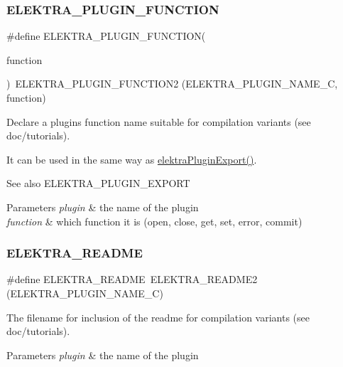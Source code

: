 \subsubsection{\texorpdfstring{ELEKTRA\_PLUGIN\_FUNCTION}{ELEKTRA\_PLUGIN\_FUNCTION}}
{\footnotesize\ttfamily \#define E\+L\+E\+K\+T\+R\+A\+\_\+\+P\+L\+U\+G\+I\+N\+\_\+\+F\+U\+N\+C\+T\+I\+ON(\begin{DoxyParamCaption}\item[{}]{function }\end{DoxyParamCaption})~E\+L\+E\+K\+T\+R\+A\+\_\+\+P\+L\+U\+G\+I\+N\+\_\+\+F\+U\+N\+C\+T\+I\+O\+N2 (E\+L\+E\+K\+T\+R\+A\+\_\+\+P\+L\+U\+G\+I\+N\+\_\+\+N\+A\+M\+E\+\_\+C, function)}



Declare a plugin\textquotesingle{}s function name suitable for compilation variants (see doc/tutorials). 

It can be used in the same way as \mbox{\hyperlink{group__plugin_ga8dd092048e972a3f0c9c9f54eb41576e}{elektra\+Plugin\+Export()}}. \begin{DoxySeeAlso}{See also}
E\+L\+E\+K\+T\+R\+A\+\_\+\+P\+L\+U\+G\+I\+N\+\_\+\+E\+X\+P\+O\+RT
\end{DoxySeeAlso}

\begin{DoxyParams}{Parameters}
{\em plugin} & the name of the plugin \\
\hline
{\em function} & which function it is (open, close, get, set, error, commit) \\
\hline
\end{DoxyParams}
\mbox{\label{group__plugin_gabdcb97b05a83130c32bbde75db80fc50}} 
\subsubsection{\texorpdfstring{ELEKTRA\_README}{ELEKTRA\_README}}
{\footnotesize\ttfamily \#define E\+L\+E\+K\+T\+R\+A\+\_\+\+R\+E\+A\+D\+ME~E\+L\+E\+K\+T\+R\+A\+\_\+\+R\+E\+A\+D\+M\+E2 (E\+L\+E\+K\+T\+R\+A\+\_\+\+P\+L\+U\+G\+I\+N\+\_\+\+N\+A\+M\+E\+\_\+C)}



The filename for inclusion of the readme for compilation variants (see doc/tutorials). 


\begin{DoxyParams}{Parameters}
{\em plugin} & the name of the plugin \\
\hline
\end{DoxyParams}
\mbox{\label{group__plugin_gaab1842b82272e6d4235b6a71587a64d9}} 
